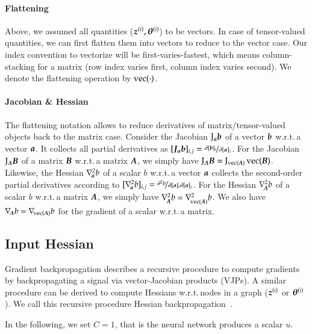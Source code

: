 \paragraph{Flattening} Above, we assumed all quantities (${\boldsymbol{z}}^{(i)}, {\boldsymbol{\theta}}^{(i)}$) to be vectors.
In case of tensor-valued quantities, we can first flatten them into vectors to reduce to the vector case.
Our index convention to vectorize will be first-varies-fastest, which means column-stacking for a matrix (row index varies first, column index varies second).
We denote the flattening operation by $\operatorname{vec}(\cdot)$.

\paragraph{Jacobian \& Hessian} The flattening notation allows to reduce derivatives of matrix/tensor-valued objects back to the matrix case.
Consider the Jacobian $\mathrm{J}_{{\boldsymbol{a}}}{\boldsymbol{b}}$ of a vector ${\boldsymbol{b}}$ w.r.t.\,a vector ${\boldsymbol{a}}$.
It collects all partial derivatives as $[{\boldsymbol{J}}_{{\boldsymbol{a}}}{\boldsymbol{b}}]_{i,j} = \nicefrac{\partial [{\boldsymbol{b}}]_i}{\partial [{\boldsymbol{a}}]_j}$.
For the Jacobian $\mathrm{J}_{{\boldsymbol{A}}}{\boldsymbol{B}}$ of a matrix ${\boldsymbol{B}}$ w.r.t.\,a matrix ${\boldsymbol{A}}$, we simply have $\mathrm{J}_{{\boldsymbol{A}}} {\boldsymbol{B}} = \mathrm{J}_{\operatorname{vec}( {\boldsymbol{A}} )}\operatorname{vec}({\boldsymbol{B}})$.
Likewise, the Hessian $\nabla_{\!{{\boldsymbol{a}}}}^{2}b$ of a scalar $b$ w.r.t.\,a vector ${\boldsymbol{a}}$ collects the second-order partial derivatives according to $[\nabla_{\!{{\boldsymbol{a}}}}^{2}b]_{i,j} = \nicefrac{\partial^2 b}{\partial [{\boldsymbol{a}}]_i \partial [{\boldsymbol{a}}]_j}$.
For the Hessian $\nabla_{\!{{\boldsymbol{A}}}}^{2} b$ of a scalar $b$ w.r.t.\,a matrix ${\boldsymbol{A}}$, we simply have $\nabla_{\!{{\boldsymbol{A}}}}^{2} b = \nabla_{\!{\operatorname{vec}({\boldsymbol{A}})}}^{2}b$.
We also have $\nabla_{\!{{\boldsymbol{A}}}} b = \nabla_{\!{\operatorname{vec}({\boldsymbol{A}})}} b$ for the gradient of a scalar w.r.t.\,a matrix.

\subsection{Input Hessian}

Gradient backpropagation describes a recursive procedure to compute gradients by backpropagating a signal via vector-Jacobian products (VJPs).
A similar procedure can be derived to compute Hessians w.r.t.\,nodes in a graph (${\boldsymbol{z}}^{(i)}$ or ${\boldsymbol{\theta}}^{(i)}$).
We call this recursive procedure Hessian backpropagation~\citep{dangel2020modular}.

In the following, we set $C = 1$, that is the neural network produces a scalar $u$.

